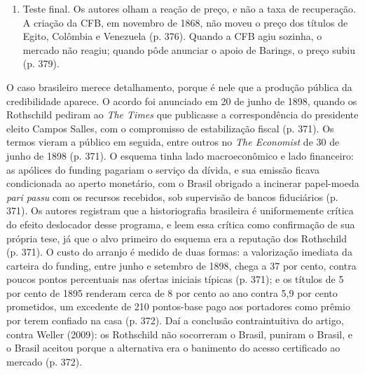 \begin{enumerate}[leftmargin=*,nosep]
  nas próprias emissões, Barings entrava no mercado de papel podre alheio, como
  agência de cobrança que restaurava crédito de terceiros para lustrar o próprio
  escudo. O caso trabalhado é a crise dos estados norte-americanos dos anos 1840
  (p. 373 a 375).
\item Teste final. Os autores olham a reação de preço, e não a taxa de
  recuperação. A criação da CFB, em novembro de 1868, não moveu o preço dos
  títulos de Egito, Colômbia e Venezuela (p. 376). Quando a CFB agiu sozinha, o
  mercado não reagiu; quando pôde anunciar o apoio de Barings, o preço subiu
  (p. 379).
\end{enumerate}

O caso brasileiro merece detalhamento, porque é nele que a produção pública da
credibilidade aparece. O acordo foi anunciado em 20 de junho de 1898, quando os
Rothschild pediram ao \emph{The Times} que publicasse a correspondência do
presidente eleito Campos Salles, com o compromisso de estabilização fiscal
(p. 371). Os termos vieram a público em seguida, entre outros no \emph{The
Economist} de 30 de junho de 1898 (p. 371). O esquema tinha lado macroeconômico
e lado financeiro: as apólices do funding pagariam o serviço da dívida, e sua
emissão ficava condicionada ao aperto monetário, com o Brasil obrigado a
incinerar papel-moeda \emph{pari passu} com os recursos recebidos, sob
supervisão de bancos fiduciários (p. 371). Os autores registram que a
historiografia brasileira é uniformemente crítica do efeito deslocador desse
programa, e leem essa crítica como confirmação de sua própria tese, já que o
alvo primeiro do esquema era a reputação dos Rothschild (p. 371). O custo do
arranjo é medido de duas formas: a valorização imediata da carteira do funding,
entre junho e setembro de 1898, chega a 37 por cento, contra poucos pontos
percentuais nas ofertas iniciais típicas (p. 371); e os títulos de 5 por cento
de 1895 renderam cerca de 8 por cento ao ano contra 5,9 por cento prometidos, um
excedente de 210 pontos-base pago aos portadores como prêmio por terem confiado
na casa (p. 372). Daí a conclusão contraintuitiva do artigo, contra Weller
(2009): os Rothschild não socorreram o Brasil, puniram o Brasil, e o Brasil
aceitou porque a alternativa era o banimento do acesso certificado ao mercado
(p. 372).


